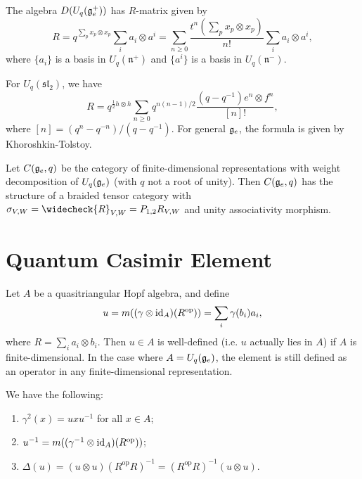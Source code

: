 \begin{remark}
  The algebra $D(U_q(\mathfrak{g}_e^+))$ has
  $R$-matrix given by
  \[
    R = q^{\sum_p x_p \otimes x_p}
    \sum_i a_i \otimes a^i
    = \sum_{n \ge 0}
    \frac{t^n (\sum_p x_p \otimes x_p)}{n!}
    \sum_i a_i \otimes a^i,
  \]
  where $\{a_i\}$ is a basis in
  $U_q(\mathfrak{n}^+)$ and
  $\{a^i\}$ is a basis in $U_q(\mathfrak{n}^-)$.
\end{remark}

\begin{example}
  For $U_q(\mathfrak{sl}_2)$, we have
  \[
    R = q^{\frac{1}{2} h \otimes h}
    \sum_{n \ge 0} q^{n(n - 1) / 2}
    \frac{(q - q^{-1}) e^n \otimes f^n}{[n]!},
  \]
  where $[n] = (q^n - q^{-n}) / (q - q^{-1})$.
  For general $\mathfrak{g}_e$, the formula is given by
  Khoroshkin-Tolstoy.
\end{example}

\pagebreak

\begin{theorem}
  Let $C(\mathfrak{g}_e, q)$ be the category of
  finite-dimensional representations
  with weight decomposition
  of $U_q(\mathfrak{g}_e)$ (with $q$ not a root of
  unity). Then
  $C(\mathfrak{g}_e, q)$ has the structure of
  a braided tensor category with
  $\sigma_{V, W} = \widecheck{R}_{V, W} = P_{1, 2} R_{V, W}$
  and unity associativity morphism.
\end{theorem}

\section{Quantum Casimir Element}

\begin{remark}
  Let $A$ be a quasitriangular Hopf algebra,
  and define
  \[
    u = m((\gamma \otimes {\operatorname{id}_A})(R^{\mathrm{op}}))
    = \sum_i \gamma(b_i) a_i,
  \]
  where $R = \sum_i a_i \otimes b_i$. Then
  $u \in A$ is well-defined
  (i.e. $u$ actually lies in $A$)
  if $A$ is finite-dimensional.
  In the case where $A = U_q(\mathfrak{g}_e)$,
  the element is still defined as an
  operator in any
  finite-dimensional representation.
\end{remark}

\begin{prop}
  We have the following:
  \begin{enumerate}
    \item $\gamma^2(x) = u x u^{-1}$ for
      all $x \in A$;
    \item $u^{-1} = m((\gamma^{-1} \otimes {\operatorname{id}_A})(R^{\mathrm{op}}))$;
    \item $\Delta(u) = (u \otimes u)(R^{\mathrm{op}} R)^{-1}
      = (R^{\mathrm{op}} R)^{-1} (u \otimes u)$.
  \end{enumerate}
\end{prop}


